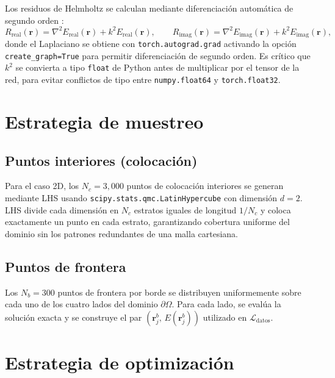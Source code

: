 Los residuos de Helmholtz se calculan mediante diferenciación automática de
segundo orden \parencite{baydin2018autodiff}:
%
\begin{equation}
    R_\text{real}(\mathbf{r}) = \nabla^2 E_\text{real}(\mathbf{r})
    + k^2 E_\text{real}(\mathbf{r}), \qquad
    R_\text{imag}(\mathbf{r}) = \nabla^2 E_\text{imag}(\mathbf{r})
    + k^2 E_\text{imag}(\mathbf{r}),
\end{equation}
%
donde el Laplaciano se obtiene con \texttt{torch.autograd.grad} activando la
opción \texttt{create\_graph=True} para permitir diferenciación de segundo orden.
Es crítico que $k^2$ se convierta a tipo \texttt{float} de Python antes de
multiplicar por el tensor de la red, para evitar conflictos de tipo entre
\texttt{numpy.float64} y \texttt{torch.float32}.

\section{Estrategia de muestreo}

\subsection{Puntos interiores (colocación)}

Para el caso 2D, los $N_c = 3{,}000$ puntos de colocación interiores se generan
mediante LHS \parencite{mckay1979lhs} usando \texttt{scipy.stats.qmc.LatinHypercube}
con dimensión $d = 2$. LHS divide cada dimensión en $N_c$ estratos iguales de
longitud $1/N_c$ y coloca exactamente un punto en cada estrato, garantizando
cobertura uniforme del dominio sin los patrones redundantes de una malla
cartesiana.

\subsection{Puntos de frontera}

Los $N_b = 300$ puntos de frontera por borde se distribuyen uniformemente sobre
cada uno de los cuatro lados del dominio $\partial\Omega$. Para cada lado, se
evalúa la solución exacta y se
construye el par $(\mathbf{r}^b_j,\, E(\mathbf{r}^b_j))$ utilizado en
$\mathcal{L}_\text{datos}$.

\section{Estrategia de optimización}

